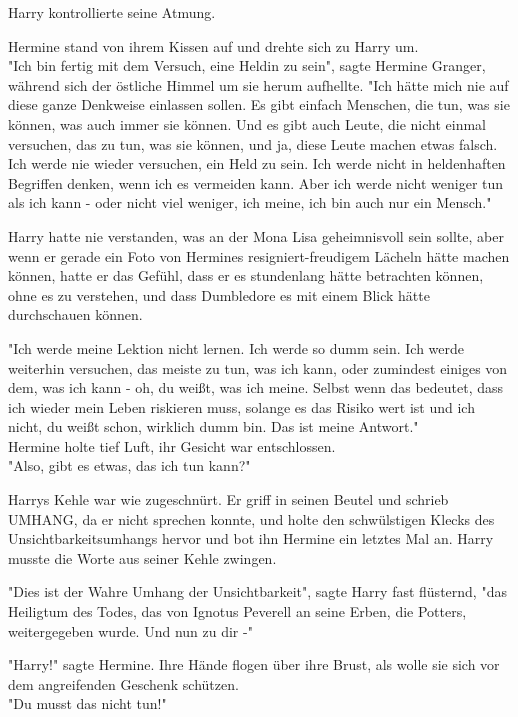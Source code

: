 {Harry kontrollierte seine Atmung.

Hermine stand von ihrem Kissen auf und drehte sich zu Harry um.\\ "Ich bin fertig mit dem Versuch, eine Heldin zu sein", sagte Hermine Granger, während sich der östliche Himmel um sie herum aufhellte. "Ich hätte mich nie auf diese ganze Denkweise einlassen sollen. Es gibt einfach Menschen, die tun, was sie können, was auch immer sie können. Und es gibt auch Leute, die nicht einmal versuchen, das zu tun, was sie können, und ja, diese Leute machen etwas falsch.\\ Ich werde nie wieder versuchen, ein Held zu sein. Ich werde nicht in heldenhaften Begriffen denken, wenn ich es vermeiden kann. Aber ich werde nicht weniger tun als ich kann - oder nicht viel weniger, ich meine, ich bin auch nur ein Mensch."

Harry hatte nie verstanden, was an der Mona Lisa geheimnisvoll sein sollte, aber wenn er gerade ein Foto von Hermines resigniert-freudigem Lächeln hätte machen können, hatte er das Gefühl, dass er es stundenlang hätte betrachten können, ohne es zu verstehen, und dass Dumbledore es mit einem Blick hätte durchschauen können.

"Ich werde meine Lektion nicht lernen. Ich werde so dumm sein. Ich werde weiterhin versuchen, das meiste zu tun, was ich kann, oder zumindest einiges von dem, was ich kann - oh, du weißt, was ich meine. Selbst wenn das bedeutet, dass ich wieder mein Leben riskieren muss, solange es das Risiko wert ist und ich nicht, du weißt schon, wirklich dumm bin. Das ist meine Antwort."\\ Hermine holte tief Luft, ihr Gesicht war entschlossen.\\ "Also, gibt es etwas, das ich tun kann?"

Harrys Kehle war wie zugeschnürt. Er griff in seinen Beutel und schrieb UMHANG, da er nicht sprechen konnte, und holte den schwülstigen Klecks des Unsichtbarkeitsumhangs hervor und bot ihn Hermine ein letztes Mal an. Harry musste die Worte aus seiner Kehle zwingen.

"Dies ist der Wahre Umhang der Unsichtbarkeit", sagte Harry fast flüsternd, "das Heiligtum des Todes, das von Ignotus Peverell an seine Erben, die Potters, weitergegeben wurde. Und nun zu dir -"

"Harry!" sagte Hermine. Ihre Hände flogen über ihre Brust, als wolle sie sich vor dem angreifenden Geschenk schützen.\\ "Du musst das nicht tun!"

}
